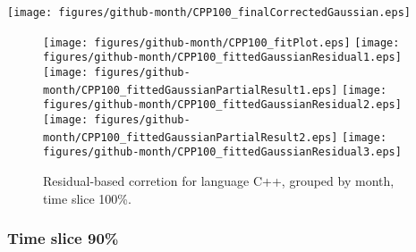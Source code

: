 \begin{center}
{\texttt{[image: figures/github-month/CPP100\_finalCorrectedGaussian.eps]}}
\end{center}

\FloatBarrier

\begin{figure}[t]
\centering
{}
{\texttt{[image: figures/github-month/CPP100\_fitPlot.eps]}}
{\texttt{[image: figures/github-month/CPP100\_fittedGaussianResidual1.eps]}}
{\texttt{[image: figures/github-month/CPP100\_fittedGaussianPartialResult1.eps]}}
{\texttt{[image: figures/github-month/CPP100\_fittedGaussianResidual2.eps]}}
{\texttt{[image: figures/github-month/CPP100\_fittedGaussianPartialResult2.eps]}}
{\texttt{[image: figures/github-month/CPP100\_fittedGaussianResidual3.eps]}}
\caption{Residual-based corretion for language C++, grouped by month, time slice 100\%.}
\end{figure}


\FloatBarrier


\subsubsection{Time slice 90\%}

